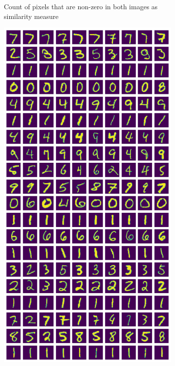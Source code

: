 \documentclass[10pt,a4paper, nocenter]{report}
\begin{document}
\begin{enumerate}
\begin{figure}[h]
\begin{center}
\begin{subfigure}[b]{0.4\textwidth}
                    \caption{Count of pixels that are non-zero in both images as similarity measure}
                    \label{fig:clustering_20_0norm}
                \end{subfigure}
                \begin{subfigure}[b]{0.4\textwidth}
                    \centering
                    \includegraphics[width=\textwidth]{../../images/number_clustering_20_2norm.png}

\end{subfigure}
\end{center}
\end{figure}
\end{enumerate}
\end{document}
